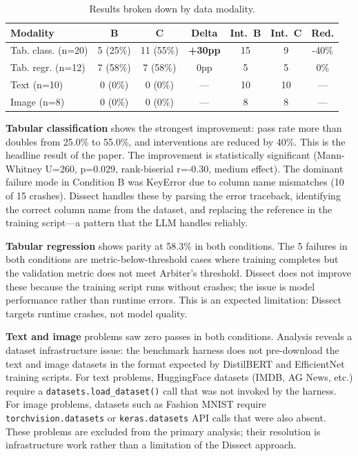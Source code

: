 \documentclass[conference]{IEEEtran}
\begin{document}
\begin{table}[ht]
  \centering
  \small
  \caption{Results broken down by data modality.}
  \label{tab:modality}
  \begin{tabular}{lcccccc}
  \toprule
  \textbf{Modality} & \textbf{B} & \textbf{C} & \textbf{Delta} &
  \textbf{Int.\ B} & \textbf{Int.\ C} & \textbf{Red.} \\
  \midrule
  Tab. class. (n=20) & 5 (25\%) & 11 (55\%) & \textbf{+30pp} & 15 & 9 & -40\% \\
  Tab. regr. (n=12) & 7 (58\%) & 7 (58\%) & 0pp & 5 & 5 & 0\% \\
  Text (n=10) & 0 (0\%) & 0 (0\%) & --- & 10 & 10 & --- \\
  Image (n=8) & 0 (0\%) & 0 (0\%) & --- & 8 & 8 & --- \\
  \bottomrule
  \end{tabular}
\end{table}

\textbf{Tabular classification} shows the strongest improvement: pass rate more than
doubles from 25.0\% to 55.0\%, and interventions are reduced by 40\%. This is the
headline result of the paper. The improvement is statistically significant
(Mann-Whitney U=260, p=0.029, rank-biserial r=-0.30, medium effect). The dominant
failure mode in Condition B was KeyError due to column name mismatches (10 of 15
crashes). Dissect handles these by parsing the error traceback, identifying the correct
column name from the dataset, and replacing the reference in the training script---a
pattern that the LLM handles reliably.

\textbf{Tabular regression} shows parity at 58.3\% in both conditions. The 5 failures in
both conditions are metric-below-threshold cases where training completes but the
validation metric does not meet Arbiter's threshold. Dissect does not improve these
because the training script runs without crashes; the issue is model performance rather
than runtime errors. This is an expected limitation: Dissect targets runtime crashes, not
model quality.

\textbf{Text and image} problems saw zero passes in both conditions. Analysis reveals a
dataset infrastructure issue: the benchmark harness does not pre-download the text and
image datasets in the format expected by DistilBERT and EfficientNet training scripts.
For text problems, HuggingFace datasets (IMDB, AG News, etc.) require a
\texttt{datasets.load\_dataset()} call that was not invoked by the harness. For image
problems, datasets such as Fashion MNIST require \texttt{torchvision.datasets} or
\texttt{keras.datasets} API calls that were also absent. These problems are excluded from
the primary analysis; their resolution is infrastructure work rather than a limitation of
the Dissect approach.
\end{document}
